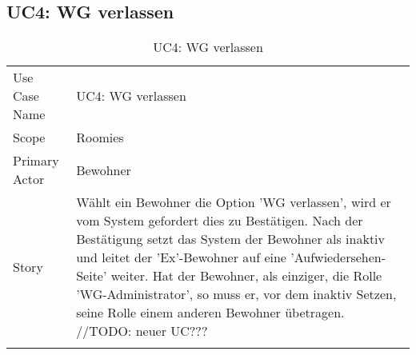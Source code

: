 \subsection{UC4: WG verlassen}
\begin{table}[H]
	\tablestyle
	\tablealtcolored
	\begin{tabularx}{\textwidth}{lX}
		\tablebody
			Use Case Name &
			UC4: WG verlassen
			\tabularnewline
			Scope &
			Roomies
			\tabularnewline
			Primary Actor &
			Bewohner
			\tabularnewline
			Story &
			Wählt ein Bewohner die Option 'WG verlassen', wird er vom System gefordert dies zu Bestätigen. Nach der Bestätigung setzt das System der Bewohner als inaktiv und leitet der 'Ex'-Bewohner auf eine 'Aufwiedersehen-Seite' weiter. \newline
			Hat der Bewohner, als einziger, die Rolle 'WG-Administrator', so muss er, vor dem inaktiv Setzen, seine Rolle einem anderen Bewohner übetragen. \newline//TODO: neuer UC???
			\tabularnewline
		\tableend
	\end{tabularx}
	\caption{UC4: WG verlassen}
\end{table}


